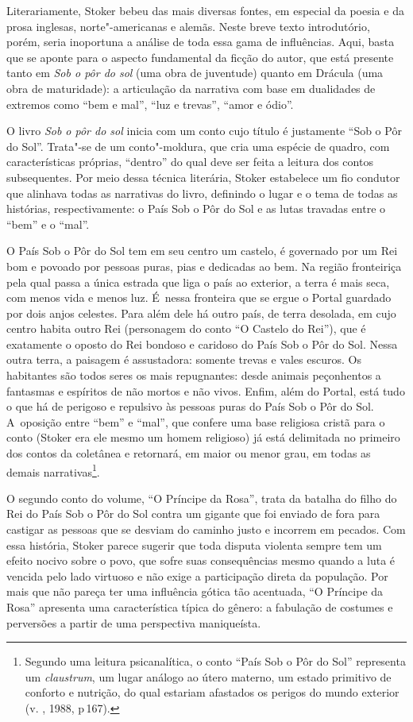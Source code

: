 Literariamente, Stoker bebeu das mais diversas fontes, em especial da
poesia e da prosa inglesas, norte"-americanas e alemãs. Neste breve texto
introdutório, porém, seria inoportuna a análise de toda essa gama de
influências. Aqui, basta que se aponte para o aspecto fundamental da
ficção do autor, que está presente tanto em \emph{Sob o pôr do sol} (uma
obra de juventude) quanto em Drácula (uma obra de maturidade): a
articulação da narrativa com base em dualidades de extremos como ``bem e
mal'', ``luz e trevas'', ``amor e ódio''.

O livro \emph{Sob o pôr do sol} inicia com um conto cujo título é
justamente ``Sob o Pôr do Sol''. Trata"-se de um conto"-moldura, que cria
uma espécie de quadro, com características próprias, ``dentro'' do qual
deve ser feita a leitura dos contos subsequentes. Por meio dessa técnica
literária, Stoker estabelece um fio condutor que alinhava todas as
narrativas do livro, definindo o lugar e o tema de todas as histórias,
respectivamente: o País Sob o Pôr do Sol e as lutas travadas entre o
``bem'' e o ``mal''.

O País Sob o Pôr do Sol tem em seu centro um castelo, é governado por um
Rei bom e povoado por pessoas puras, pias e dedicadas ao bem. Na região
fronteiriça pela qual passa a única estrada que liga o país ao exterior, a
terra é mais seca, com menos vida e menos luz. É~nessa fronteira que se
ergue o Portal guardado por dois anjos celestes. Para além dele há outro
país, de terra desolada, em cujo centro habita outro Rei (personagem do
conto ``O Castelo do Rei''), que é exatamente o oposto do Rei bondoso e
caridoso do País Sob o Pôr do Sol. Nessa outra terra, a paisagem é
assustadora: somente trevas e vales escuros. Os habitantes são todos
seres os mais repugnantes: desde animais peçonhentos a fantasmas e
espíritos de não mortos e não vivos. Enfim, além do Portal, está tudo o
que há de perigoso e repulsivo às pessoas puras do País Sob o Pôr do
Sol. A~oposição entre ``bem'' e ``mal'', que confere uma base religiosa
cristã para o conto (Stoker era ele mesmo um homem religioso) já está
delimitada no primeiro dos contos da coletânea e retornará, em maior ou
menor grau, em todas as demais narrativas\footnote{Segundo uma leitura psicanalítica, o conto
``País Sob o Pôr do Sol'' representa um \emph{claustrum}, um lugar
análogo ao útero materno, um estado primitivo de conforto e nutrição, do
qual estariam afastados os perigos do mundo exterior (v. , 1988,
p\,167).}.

O segundo conto do volume, ``O Príncipe da Rosa'', trata da batalha do
filho do Rei do País Sob o Pôr do Sol contra um gigante que foi enviado
de fora para castigar as pessoas que se desviam do caminho justo e
incorrem em pecados. Com essa história, Stoker parece sugerir que toda
disputa violenta sempre tem um efeito nocivo sobre o povo, que sofre
suas consequências mesmo quando a luta é vencida pelo lado virtuoso e
não exige a participação direta da população. Por mais que não pareça
ter uma influência gótica tão acentuada, ``O Príncipe da Rosa''
apresenta uma característica típica do gênero: a fabulação de costumes e
perversões a partir de uma perspectiva maniqueísta.

